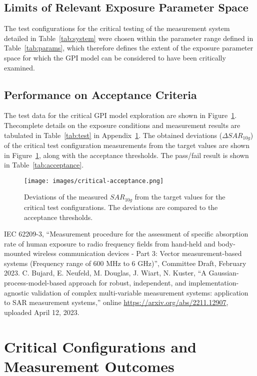 \documentclass{article}
\begin{document}
\subsection{Limits of Relevant Exposure Parameter Space}
The test configurations for the critical testing of the measurement system detailed in Table~\ref{tab:system} were chosen within the parameter range defined in Table~\ref{tab:params}, which therefore defines the extent of the exposure parameter space for which the GPI model can be considered to have been critically examined.



\FloatBarrier
\subsection{Performance on Acceptance Criteria}
The test data for the critical GPI model exploration are shown in Figure~\ref{fig:critical-acc}. Thecomplete details on the exposure conditions and measurement results are tabulated in Table~\ref{tab:test} in Appendix~\ref{sec:critical-data}.
The obtained deviations ($\Delta SAR_{10g}$) of the critical test configuration measurements from the target values are shown in Figure~\ref{fig:critical-acc}, along with the acceptance thresholds. The pass/fail result is shown in Table~\ref{tab:acceptance}.



\begin{figure}[H] \centering
\texttt{[image: images/critical-acceptance.png]}
\caption{Deviations of the measured $SAR_{10g}$ from the target values for the critical test configurations. The deviations are compared to the acceptance thresholds.} \label{fig:critical-acc}
\end{figure}

\FloatBarrier

\newpage

\begin{thebibliography}{9}
IEC 62209-3, ``Measurement procedure for the assessment of specific absorption rate of human exposure to radio frequency fields from hand-held and body-mounted wireless communication devices - Part 3: Vector measurement-based systems (Frequency range of 600 MHz to 6 GHz)'', Committee Draft, February 2023.
C. Bujard, E. Neufeld, M. Douglas, J. Wiart, N. Kuster, ``A Gaussian-process-model-based approach for robust, independent, and implementation-agnostic validation of complex multi-variable measurement systems: application to SAR measurement systems,'' online \url{https://arxiv.org/abs/2211.12907}, uploaded April 12, 2023.
\end{thebibliography}

\FloatBarrier
\newpage
\appendix
\section{Critical Configurations and Measurement Outcomes} \label{sec:critical-data}


\end{document}

